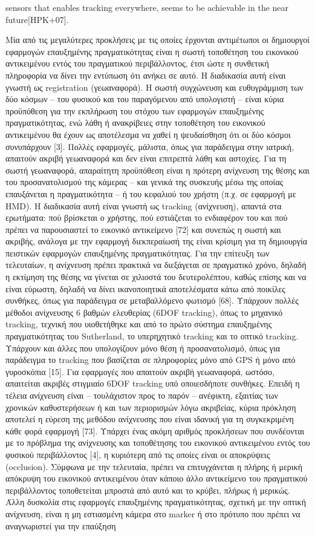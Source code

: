 sensors that enables tracking everywhere, seems to be achievable in the near future[HPK+07].


Μία από τις μεγαλύτερες προκλήσεις με τις οποίες έρχονται αντιμέτωποι οι δημιουργοί εφαρμογών επαυξημένης πραγματικότητας είναι η σωστή τοποθέτηση του εικονικού αντικειμένου εντός του πραγματικού περιβάλλοντος, έτσι ώστε η συνθετική πληροφορία να δίνει την εντύπωση ότι ανήκει σε αυτό. Η διαδικασία αυτή είναι γνωστή ως registration (γεωαναφορά). Η σωστή συγχώνευση και ευθυγράμμιση των δύο κόσμων – του φυσικού και του παραγόμενου από υπολογιστή – είναι κύρια προϋπόθεση για την εκπλήρωση του στόχου των εφαρμογών επαυξημένης πραγματικότητας, ενώ λάθη ή ανακρίβειες στην τοποθέτηση του εικονικού αντικειμένου θα έχουν ως αποτέλεσμα να χαθεί η ψευδαίσθηση ότι οι δύο κόσμοι συνυπάρχουν [3]. Πολλές εφαρμογές, μάλιστα, όπως για παράδειγμα στην ιατρική, απαιτούν ακριβή γεωαναφορά και δεν είναι επιτρεπτά λάθη και αστοχίες. Για τη σωστή γεωαναφορά, απαραίτητη προϋπόθεση είναι η πρότερη ανίχνευση της θέσης και του προσανατολισμού της κάμερας – και γενικά της συσκευής μέσω της οποίας επαυξάνεται η πραγματικότητα – ή του κεφαλιού του χρήστη (π.χ. σε εφαρμογή με HMD). Η διαδικασία αυτή είναι γνωστή ως tracking (ανίχνευση), απαντά στα ερωτήματα: πού βρίσκεται ο χρήστης, πού εστιάζεται το ενδιαφέρον του και πού πρέπει να παρουσιαστεί το εικονικό αντικείμενο [72] και συνεπώς η σωστή και ακριβής, ανάλογα με την εφαρμογή διεκπεραίωσή της είναι κρίσιμη για τη δημιουργία πειστικών εφαρμογών επαυξημένης πραγματικότητας. Για την επίτευξη των τελευταίων, η ανίχνευση πρέπει πρακτικά να διεξάγεται σε πραγματικό χρόνο, δηλαδή η εκτίμηση της θέσης να γίνεται σε χιλιοστά του δευτερολέπτου, καθώς επίσης και να είναι εύρωστη, δηλαδή να δίνει ικανοποιητικά αποτελέσματα κάτω από ποικίλες συνθήκες, όπως για παράδειγμα σε μεταβαλλόμενο φωτισμό [68]. Υπάρχουν πολλές μέθοδοι ανίχνευσης 6 βαθμών ελευθερίας (6DOF tracking), όπως το μηχανικό tracking, τεχνική που υιοθετήθηκε και από το πρώτο σύστημα επαυξημένης πραγματικότητας του Sutherland, το υπερηχητικό tracking και το οπτικό tracking. Υπάρχουν και άλλες που υπολογίζουν μόνο θέση ή προσανατολισμό, όπως για παράδειγμα το tracking που βασίζεται σε πληροφορίες μόνο από GPS ή μόνο από γυροσκόπια [15]. Για εφαρμογές που απαιτούν ακριβή γεωαναφορά, ωστόσο, απαιτείται ακριβές στιγμιαίο 6DOF tracking υπό οποιεσδήποτε συνθήκες. Επειδή η τέλεια ανίχνευση είναι – τουλάχιστον προς το παρόν – ανέφικτη, εξαιτίας των χρονικών καθυστερήσεων ή και των περιορισμών λόγω ακριβείας, κύρια πρόκληση αποτελεί η εύρεση της μεθόδου ανίχνευσης που είναι ιδανική για τη συγκεκριμένη κάθε φορά εφαρμογή [73]. Υπάρχει ένας ακόμη αριθμός προκλήσεων που συνδέονται με το πρόβλημα της ανίχνευσης και τοποθέτησης του εικονικού αντικειμένου εντός του φυσικού περιβάλλοντος [4], η κυριότερη από τις οποίες είναι οι αποκρύψεις (occlusion). Σύμφωνα με την τελευταία, πρέπει να επιτυγχάνεται η πλήρης ή μερική απόκρυψη του εικονικού αντικειμένου όταν κάποιο άλλο αντικείμενο του πραγματικού περιβάλλοντος τοποθετείται μπροστά από αυτό και το κρύβει, πλήρως ή μερικώς. Άλλη δυσκολία στις εφαρμογές επαυξημένης πραγματικότητας, σχετική με την οπτική ανίχνευση, είναι η μη εστιασμένη κάμερα στο marker ή στο πρότυπο που πρέπει να αναγνωριστεί για την επαύξηση 